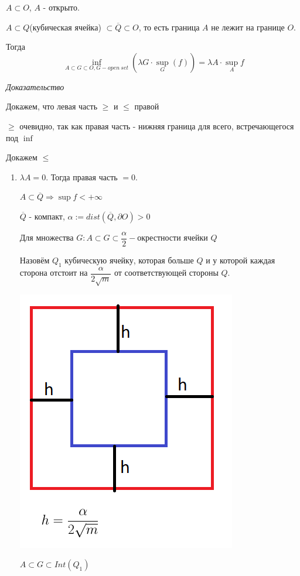 \documentclass[paper=a4, fontsize=17pt]{article}
\begin{document}
$A \subset O$, $A$ - открыто.

$A \subset Q$(кубическая ячейка) $\subset \overline Q \subset O$, то есть граница $A$ не лежит на границе $O$.

Тогда $$\inf_{A \subset G \subset O, G - open ~ set} (\lambda G \cdot \sup_G(f)) = \lambda A \cdot \sup_A f$$

\emph{Доказательство}

Докажем, что левая часть $\geqslant$ и $\leqslant$ правой

$\geqslant$ очевидно, так как правая часть - нижняя граница для всего, встречающегося под $\inf$

Докажем $\leqslant$

\begin{enumerate}
	\item $\lambda A = 0$. Тогда правая часть $ = 0$.

	$A \subset \overline{Q} \Rightarrow \sup f < + \infty$

	$\overline{Q}$ - компакт, $\alpha := dist(\overline{Q}, \partial O) > 0$

	Для множества $G: A \subset G \subset \dfrac{\alpha}{2}-$окрестности ячейки $Q$

	Назовём $Q_1$ кубическую ячейку, которая больше $Q$ и у которой каждая сторона отстоит на $\dfrac{\alpha}{2 \sqrt{m}}$ от соответствующей стороны $Q$.

	\includegraphics[scale=1]{Th21Pic1.png}

	$A \subset G \subset Int(Q_1)$


\end{enumerate}
\end{document}

